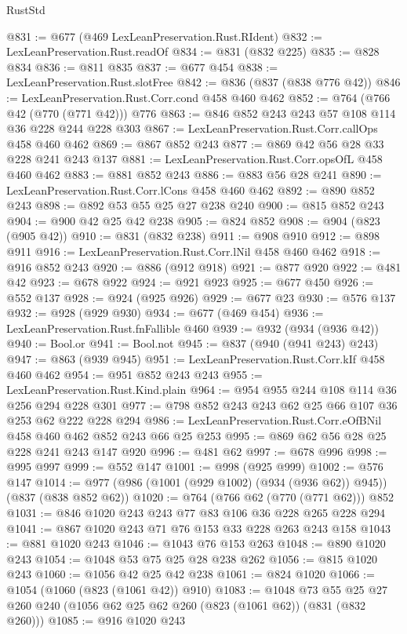 \begin{lexlean}{RustStd}
\begin{coremodule}
@831 := @677 (@469 LexLeanPreservation.Rust.RIdent)
@832 := LexLeanPreservation.Rust.readOf
@834 := @831 (@832 @225)
@835 := @828 @834
@836 := @811 @835
@837 := @677 @454
@838 := LexLeanPreservation.Rust.slotFree
@842 := @836 (@837 (@838 @776 @42))
@846 := LexLeanPreservation.Rust.Corr.cond @458 @460 @462
@852 := @764 (@766 @42 (@770 (@771 @42))) @776
@863 := @846 @852 @243 @243 @57 @108 @114 @36 @228 @244 @228 @303
@867 := LexLeanPreservation.Rust.Corr.callOps @458 @460 @462
@869 := @867 @852 @243
@877 := @869 @42 @56 @28 @33 @228 @241 @243 @137
@881 := LexLeanPreservation.Rust.Corr.opsOfL @458 @460 @462
@883 := @881 @852 @243
@886 := @883 @56 @28 @241
@890 := LexLeanPreservation.Rust.Corr.lCons @458 @460 @462
@892 := @890 @852 @243
@898 := @892 @53 @55 @25 @27 @238 @240
@900 := @815 @852 @243
@904 := @900 @42 @25 @42 @238
@905 := @824 @852
@908 := @904 (@823 (@905 @42))
@910 := @831 (@832 @238)
@911 := @908 @910
@912 := @898 @911
@916 := LexLeanPreservation.Rust.Corr.lNil @458 @460 @462
@918 := @916 @852 @243
@920 := @886 (@912 @918)
@921 := @877 @920
@922 := @481 @42
@923 := @678 @922
@924 := @921 @923
@925 := @677 @450
@926 := @552 @137
@928 := @924 (@925 @926)
@929 := @677 @23
@930 := @576 @137
@932 := @928 (@929 @930)
@934 := @677 (@469 @454)
@936 := LexLeanPreservation.Rust.fnFallible @460
@939 := @932 (@934 (@936 @42))
@940 := Bool.or
@941 := Bool.not
@945 := @837 (@940 (@941 @243) @243)
@947 := @863 (@939 @945)
@951 := LexLeanPreservation.Rust.Corr.kIf @458 @460 @462
@954 := @951 @852 @243 @243
@955 := LexLeanPreservation.Rust.Kind.plain
@964 := @954 @955 @244 @108 @114 @36 @256 @294 @228 @301
@977 := @798 @852 @243 @243 @62 @25 @66 @107 @36 @253 @62 @222 @228 @294
@986 := LexLeanPreservation.Rust.Corr.eOfBNil @458 @460 @462 @852 @243 @66 @25 @253
@995 := @869 @62 @56 @28 @25 @228 @241 @243 @147 @920
@996 := @481 @62
@997 := @678 @996
@998 := @995 @997
@999 := @552 @147
@1001 := @998 (@925 @999)
@1002 := @576 @147
@1014 := @977 (@986 (@1001 (@929 @1002) (@934 (@936 @62)) @945)) (@837 (@838 @852 @62))
@1020 := @764 (@766 @62 (@770 (@771 @62))) @852
@1031 := @846 @1020 @243 @243 @77 @83 @106 @36 @228 @265 @228 @294
@1041 := @867 @1020 @243 @71 @76 @153 @33 @228 @263 @243 @158
@1043 := @881 @1020 @243
@1046 := @1043 @76 @153 @263
@1048 := @890 @1020 @243
@1054 := @1048 @53 @75 @25 @28 @238 @262
@1056 := @815 @1020 @243
@1060 := @1056 @42 @25 @42 @238
@1061 := @824 @1020
@1066 := @1054 (@1060 (@823 (@1061 @42)) @910)
@1083 := @1048
    @73
    @55
    @25
    @27
    @260
    @240
    (@1056 @62 @25 @62 @260 (@823 (@1061 @62)) (@831 (@832 @260)))
@1085 := @916 @1020 @243

\end{coremodule}
\end{lexlean}
